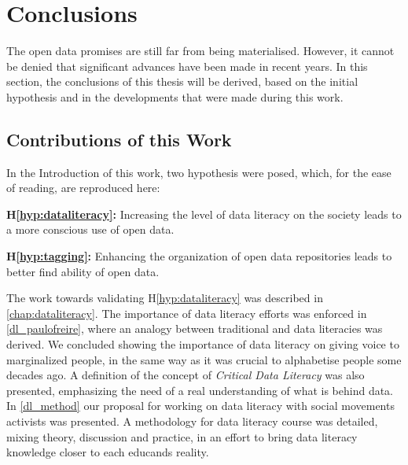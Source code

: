 \chapter{Conclusions}
\label{chap:conclusions}



The open data promises are still far from being materialised.
However, it cannot be denied that significant advances have been made in recent years.
In this section, the conclusions of this thesis will be derived, based on the initial hypothesis and in the developments that were made during this work.

\section{Contributions of this Work}

In the Introduction of this work, two hypothesis were posed, which, for the ease of reading, are reproduced here:

\noindent\textbf{H\ref{hyp:dataliteracy}:} Increasing the level of data literacy on the society leads to a more conscious use of open data.

\noindent\textbf{H\ref{hyp:tagging}:} Enhancing the organization of open data repositories leads to better find ability of open data.

The work towards validating H\ref{hyp:dataliteracy} was described in \autoref{chap:dataliteracy}.
The importance of data literacy efforts was enforced in \autoref{dl_paulofreire}, where an analogy between traditional and data literacies was derived.
We concluded showing the importance of data literacy on giving voice to marginalized people, in the same way as it was crucial to alphabetise people some decades ago.
A definition of the concept of \emph{Critical Data Literacy} was also presented, emphasizing the need of a real understanding of what is behind data.
In \autoref{dl_method} our proposal for working on data literacy with social movements activists was presented.
A methodology for data literacy course was detailed, mixing theory, discussion and practice, in an effort to bring data literacy knowledge closer to each educands reality.

